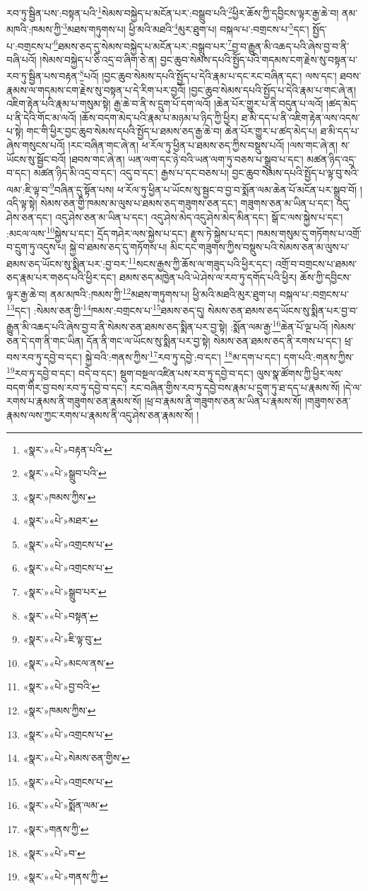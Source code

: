 རབ་ཏུ་སྦྱིན་པས་:བསྟན་པའི་\footnote{«སྣར་»«པེ་»བརྟན་པའི་}སེམས་བསྐྱེད་པ་མངོན་པར་:བསྒྲུབ་པའི་\footnote{«སྣར་»«པེ་»སྒྲུབ་པའི་}ཕྱིར་ཆོས་ཀྱི་དབྱིངས་ལྟར་རྒྱ་ཆེ་བ། ནམ་མཁའི་:ཁམས་ཀྱི་\footnote{«སྣར་»ཁམས་ཀྱིས་}མཐས་གཏུགས་པ། ཕྱི་མའི་མཐའི་\footnote{«སྣར་»«པེ་»མཐར་}མུར་ཐུག་པ། བསྐལ་པ་:བགྲངས་པ་\footnote{«སྣར་»«པེ་»འགྲངས་པ་}དང་། སྤྱོད་པ་:བགྲངས་པ་\footnote{«སྣར་»«པེ་»འགྲངས་པ་}ཐམས་ཅད་དུ་སེམས་བསྐྱེད་པ་མངོན་པར་:བསྒྲུབ་པར་\footnote{«སྣར་»«པེ་»སྒྲུབ་པར་}བྱ་བ་རྒྱུན་མི་འཆད་པའི་ཞེས་བྱ་བ་ནི་བཞི་པའོ། །སེམས་བསྐྱེད་པ་ཅི་འདྲ་བ་ཞིག་ཅེ་ན། བྱང་ཆུབ་སེམས་དཔའི་སྤྱོད་པའི་གདམས་ངག་རྗེས་སུ་བསྟན་པ་རབ་ཏུ་སྦྱིན་པས་བརྟན་\footnote{«སྣར་»«པེ་»བསྟན་}པའོ། །བྱང་ཆུབ་སེམས་དཔའི་སྤྱོད་པ་དེའི་རྣམ་པ་དང་རང་བཞིན་དང་། ལས་དང་། ཐབས་རྣམས་ལ་གདམས་ངག་རྗེས་སུ་བསྟན་པ་དེ་རིག་པར་བྱའོ། །བྱང་ཆུབ་སེམས་དཔའི་སྤྱོད་པ་དེའི་རྣམ་པ་གང་ཞེ་ན། འཇིག་རྟེན་པའི་རྣམ་པ་གསུམ་སྟེ། རྒྱ་ཆེ་བ་ནི་ས་དྲུག་པོ་དག་ལའོ། །ཆེན་པོར་གྱུར་པ་ནི་བདུན་པ་ལའོ། །ཚད་མེད་པ་ནི་དེའི་གོང་མ་ལའོ། །ཆོས་བདག་མེད་པའི་རྣམ་པ་མཉམ་པ་ཉིད་ཀྱི་ཕྱིར། ཐ་མི་དད་པ་ནི་འཇིག་རྟེན་ལས་འདས་པ་སྟེ། གང་གི་ཕྱིར་བྱང་ཆུབ་སེམས་དཔའི་སྤྱོད་པ་ཐམས་ཅད་རྒྱ་ཆེ་བ། ཆེན་པོར་གྱུར་པ་ཚད་མེད་པ། ཐ་མི་དད་པ་ཞེས་གསུངས་པའོ། །རང་བཞིན་གང་ཞེ་ན། ཕ་རོལ་ཏུ་ཕྱིན་པ་ཐམས་ཅད་ཀྱིས་བསྡུས་པའོ། །ལས་གང་ཞེ་ན། ས་ཡོངས་སུ་སྦྱོང་བའོ། །ཐབས་གང་ཞེ་ན། ཡན་ལག་དང་ཉེ་བའི་ཡན་ལག་ཏུ་བཅས་པ་སྒྲུབ་པ་དང་། མཚན་ཉིད་འདྲ་བ་དང་། མཚན་ཉིད་མི་འདྲ་བ་དང་། འདུ་བ་དང་། རྒྱས་པ་དང་བཅས་པ། བྱང་ཆུབ་སེམས་དཔའི་སྤྱོད་པ་ལྟ་བུ་སའི་ལམ་:ཇི་ལྟ་བ་\footnote{«སྣར་»«པེ་»ཇི་ལྟ་བུ་}བཞིན་དུ་སྟོན་པས། ཕ་རོལ་ཏུ་ཕྱིན་པ་ཡོངས་སུ་སྦྱང་བ་བྱ་བ་སྨོན་ལམ་ཆེན་པོ་མངོན་པར་སྒྲུབ་བོ། །འདི་ལྟ་སྟེ། སེམས་ཅན་གྱི་ཁམས་མ་ལུས་པ་ཐམས་ཅད་གཟུགས་ཅན་དང་། གཟུགས་ཅན་མ་ཡིན་པ་དང་། འདུ་ཤེས་ཅན་དང་། འདུ་ཤེས་ཅན་མ་ཡིན་པ་དང་། འདུ་ཤེས་མེད་འདུ་ཤེས་མེད་མིན་དང་། སྒོ་ང་ལས་སྐྱེས་པ་དང་། :མངལ་ལས་\footnote{«སྣར་»«པེ་»མངལ་ནས་}སྐྱེས་པ་དང་། དྲོད་གཤེར་ལས་སྐྱེས་པ་དང་། རྫུས་ཏེ་སྐྱེས་པ་དང་། ཁམས་གསུམ་དུ་གཏོགས་པ་འགྲོ་བ་དྲུག་ཏུ་འདུས་པ། སྐྱེ་བ་ཐམས་ཅད་དུ་གཏོགས་པ། མིང་དང་གཟུགས་ཀྱིས་བསྡུས་པའི་སེམས་ཅན་མ་ལུས་པ་ཐམས་ཅད་ཡོངས་སུ་སྨིན་པར་:བྱ་བར་\footnote{«སྣར་»«པེ་»བྱ་བའི་}སངས་རྒྱས་ཀྱི་ཆོས་ལ་གཟུད་པའི་ཕྱིར་དང་། འགྲོ་བ་བགྲངས་པ་ཐམས་ཅད་རྣམ་པར་གཅད་པའི་ཕྱིར་དང་། ཐམས་ཅད་མཁྱེན་པའི་ཡེ་ཤེས་ལ་རབ་ཏུ་དགོད་པའི་ཕྱིར། ཆོས་ཀྱི་དབྱིངས་ལྟར་རྒྱ་ཆེ་བ། ནམ་མཁའི་:ཁམས་ཀྱི་\footnote{«སྣར་»ཁམས་ཀྱིས་}མཐས་གཏུགས་པ། ཕྱི་མའི་མཐའི་མུར་ཐུག་པ། བསྐལ་པ་:བགྲངས་པ་\footnote{«སྣར་»«པེ་»འགྲངས་པ་}དང་། :སེམས་ཅན་གྱི་\footnote{«སྣར་»«པེ་»སེམས་ཅན་གྱིས་}ཁམས་:བགྲངས་པ་\footnote{«སྣར་»«པེ་»འགྲངས་པ་}ཐམས་ཅད་དུ། སེམས་ཅན་ཐམས་ཅད་ཡོངས་སུ་སྨིན་པར་བྱ་བ་རྒྱུན་མི་འཆད་པའི་ཞེས་བྱ་བ་ནི་སེམས་ཅན་ཐམས་ཅད་སྨིན་པར་བྱ་སྟེ། :སྨོན་ལམ་རྒྱ་\footnote{«སྣར་»«པེ་»སྨོན་ལམ་}ཆེན་པོ་ལྔ་པའོ། །སེམས་ཅན་དེ་དག་ནི་གང་ཡིན། དོན་ནི་གང་ལ་ཡོངས་སུ་སྨིན་པར་བྱ་སྟེ། སེམས་ཅན་ཐམས་ཅད་ནི་རགས་པ་དང་། ཕྲ་བས་རབ་ཏུ་དབྱེ་བ་དང་། སྐྱེ་བའི་:གནས་ཀྱིས་\footnote{«སྣར་»གནས་ཀྱི་}རབ་ཏུ་དབྱེ་:བ་དང་། \footnote{«སྣར་»«པེ་»བ་}མ་དག་པ་དང་། དག་པའི་:གནས་ཀྱིས་\footnote{«སྣར་»«པེ་»གནས་ཀྱི་}རབ་ཏུ་དབྱེ་བ་དང་། བདེ་བ་དང་། སྡུག་བསྔལ་འཛིན་པས་རབ་ཏུ་དབྱེ་བ་དང་། ལུས་སྣ་ཚོགས་ཀྱི་ཕྱིར་ལས་བདག་གིར་བྱ་བས་རབ་ཏུ་དབྱེ་བ་དང་། རང་བཞིན་གྱིས་རབ་ཏུ་དབྱེ་བས་རྣམ་པ་དྲུག་ཏུ་ཐ་དད་པ་རྣམས་སོ། །དེ་ལ་རགས་པ་རྣམས་ནི་གཟུགས་ཅན་རྣམས་སོ། །ཕྲ་བ་རྣམས་ནི་གཟུགས་ཅན་མ་ཡིན་པ་རྣམས་སོ། །གཟུགས་ཅན་རྣམས་ལས་ཀྱང་རགས་པ་རྣམས་ནི་འདུ་ཤེས་ཅན་རྣམས་སོ། །
